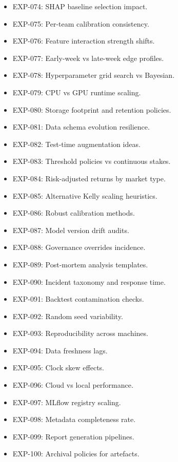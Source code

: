 \documentclass[12pt]{report}  %
\numberwithin{equation}{section}
\theoremstyle{plain}
\theoremstyle{definition}
\theoremstyle{remark}
\begin{document}
\begin{itemize}
  \item EXP-074: SHAP baseline selection impact.
  \item EXP-075: Per-team calibration consistency.
  \item EXP-076: Feature interaction strength shifts.
  \item EXP-077: Early-week vs late-week edge profiles.
  \item EXP-078: Hyperparameter grid search vs Bayesian.
  \item EXP-079: CPU vs GPU runtime scaling.
  \item EXP-080: Storage footprint and retention policies.
  \item EXP-081: Data schema evolution resilience.
  \item EXP-082: Test-time augmentation ideas.
  \item EXP-083: Threshold policies vs continuous stakes.
  \item EXP-084: Risk-adjusted returns by market type.
  \item EXP-085: Alternative Kelly scaling heuristics.
  \item EXP-086: Robust calibration methods.
  \item EXP-087: Model version drift audits.
  \item EXP-088: Governance overrides incidence.
  \item EXP-089: Post-mortem analysis templates.
  \item EXP-090: Incident taxonomy and response time.
  \item EXP-091: Backtest contamination checks.
  \item EXP-092: Random seed variability.
  \item EXP-093: Reproducibility across machines.
  \item EXP-094: Data freshness lags.
  \item EXP-095: Clock skew effects.
  \item EXP-096: Cloud vs local performance.
  \item EXP-097: MLflow registry scaling.
  \item EXP-098: Metadata completeness rate.
  \item EXP-099: Report generation pipelines.
  \item EXP-100: Archival policies for artefacts.
\end{itemize}
\end{document}
